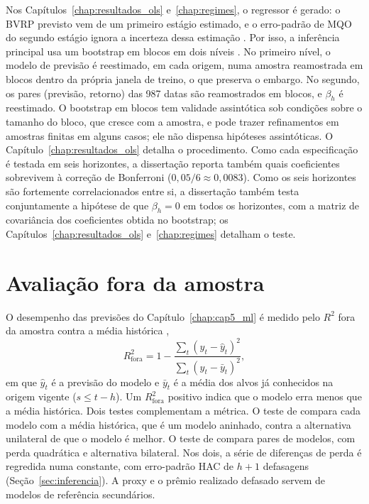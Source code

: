 Nos Capítulos~\ref{chap:resultados_ols} e~\ref{chap:regimes}, o regressor é
gerado: o BVRP previsto vem de um primeiro estágio estimado, e o erro-padrão de
MQO do segundo estágio ignora a incerteza dessa estimação \citep{pagan1984}.
Por isso, a inferência principal usa um bootstrap em blocos em dois níveis
\citep{kunsch1989}. No primeiro nível, o modelo de previsão é reestimado, em
cada origem, numa amostra reamostrada em blocos dentro da própria janela de
treino, o que preserva o embargo. No segundo, os pares (previsão, retorno) das
987 datas são reamostrados em blocos, e $\beta_h$ é reestimado. O bootstrap em
blocos tem validade assintótica sob condições sobre o tamanho do bloco, que
cresce com a amostra, e pode trazer refinamentos em amostras finitas em alguns
casos; ele não dispensa hipóteses assintóticas. O
Capítulo~\ref{chap:resultados_ols} detalha o procedimento. Como cada
especificação é testada em seis horizontes, a dissertação reporta também quais
coeficientes sobrevivem à correção de Bonferroni ($0{,}05/6 \approx 0{,}0083$).
Como os seis horizontes são fortemente correlacionados entre si, a dissertação
também testa conjuntamente a hipótese de que $\beta_h = 0$ em todos os
horizontes, com a matriz de covariância dos coeficientes obtida no bootstrap;
os Capítulos~\ref{chap:resultados_ols} e~\ref{chap:regimes} detalham o teste.

\section{Avaliação fora da amostra}
\label{sec:avaliacao_oos}

O desempenho das previsões do Capítulo~\ref{chap:cap5_ml} é medido pelo $R^2$
fora da amostra contra a média histórica \citep{campbell2008predicting},
\[
R^2_{\text{fora}} = 1 - \frac{\sum_t (y_t - \hat{y}_t)^2}{\sum_t (y_t - \bar{y}_t)^2},
\]
em que $\hat{y}_t$ é a previsão do modelo e $\bar{y}_t$ é a média dos alvos já
conhecidos na origem vigente ($s \le t - h$). Um $R^2_{\text{fora}}$ positivo
indica que o modelo erra menos que a média histórica. Dois testes complementam
a métrica. O teste de \citet{clark2007approximately} compara cada modelo com a
média histórica, que é um modelo aninhado, contra a alternativa unilateral de
que o modelo é melhor. O teste de \citet{diebold1995comparing} compara pares de
modelos, com perda quadrática e alternativa bilateral. Nos dois, a série de
diferenças de perda é regredida numa constante, com erro-padrão HAC de $h+1$
defasagens (Seção~\ref{sec:inferencia}). A proxy e o prêmio realizado defasado
servem de modelos de referência secundários.

